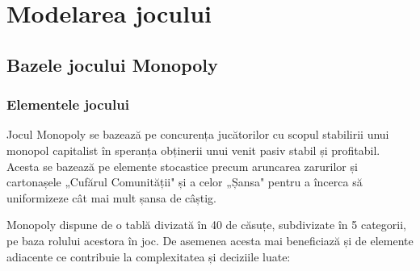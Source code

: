 \chapter{Modelarea jocului}

\section{Bazele jocului Monopoly}
\subsection{Elementele jocului}
Jocul Monopoly se bazează pe concurența jucătorilor cu scopul stabilirii unui monopol capitalist în speranța obținerii unui venit pasiv stabil și profitabil. Acesta se bazează pe elemente stocastice precum aruncarea zarurilor și cartonașele „Cufărul Comunității" și a celor „Șansa" pentru a încerca să uniformizeze cât mai mult șansa de câștig.

Monopoly dispune de o tablă divizată în 40 de căsuțe, subdivizate în 5 categorii, pe baza rolului acestora în joc. De asemenea acesta mai beneficiază și de elemente adiacente ce contribuie la complexitatea și deciziile luate:


